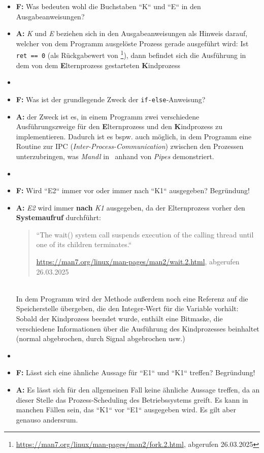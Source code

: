 \begin{itemize}
    \itemsep0.5em
    \item \textbf{F:} Was bedeuten wohl die Buchstaben ``K`` und ``E`` in den Ausgabeanweisungen?
    \item \textbf{A:} \textit{K} und \textit{E} beziehen sich in den Ausgabeanweisungen als Hinweis darauf, welcher von dem Programm ausgelöste Prozess gerade ausgeführt wird: Ist \texttt{ret == 0} (als Rückgabewert von \footnote{
        \url{https://man7.org/linux/man-pages/man2/fork.2.html}, abgerufen 26.03.2025
    }), dann befindet sich die Ausführung in dem von dem \textbf{E}lternprozess gestarteten \textbf{K}indprozess
    \item[]
    \item \textbf{F:} Was ist der grundlegende Zweck der \texttt{if‐else}‐Anweisung?
    \item \textbf{A:} der Zweck ist es, in einem Programm zwei verschiedene Ausführungszweige für den \textbf{E}lternprozess und den \textbf{K}indprozess zu implementieren.
    Dadurch ist es bspw. auch möglich, in dem Programm eine Routine zur IPC (\textit{Inter-Process-Communication}) zwischen den Prozessen unterzubringen, was \textit{Mandl} in~\cite[180 f.]{Man20g} anhand von \textit{Pipes} demonstriert.
    \item[]
    \item \textbf{F:} Wird ``E2`` immer vor oder immer nach ``K1`` ausgegeben? Begründung!
    \item \textbf{A:} \textit{E2} wird immer \textbf{nach} \textit{K1} ausgegeben, da der Elternprozess vorher den \textbf{Systemaufruf}  durchführt:
    \blockquote[{\url{https://man7.org/linux/man-pages/man2/wait.2.html}, abgerufen 26.03.2025}]{
        ``The wait() system call suspends execution of the calling thread
        until one of its children terminates.``
    }\\
    \noindent
    In dem Programm wird der Methode außerdem noch eine Referenz auf die Speicherstelle übergeben, die den Integer-Wert für die Variable  vorhält: Sobald der Kindprozess beendet wurde, enthält   eine Bitmaske, die verschiedene Informationen über die Ausführung des Kindprozesses beinhaltet (normal abgebrochen, durch Signal abgebrochen usw.)
    \item[]
    \item \textbf{F:} Lässt sich eine ähnliche Aussage für ``E1`` und ``K1`` treffen? Begründung!
    \item \textbf{A:} Es lässt sich für den allgemeinen Fall keine ähnliche Aussage treffen, da an dieser Stelle das Prozess-Scheduling des Betriebssystems greift. Es kann in manchen Fällen sein, das ``K1`` vor ``E1`` ausgegeben wird. Es gilt aber genauso andersrum.\\

\end{itemize}
